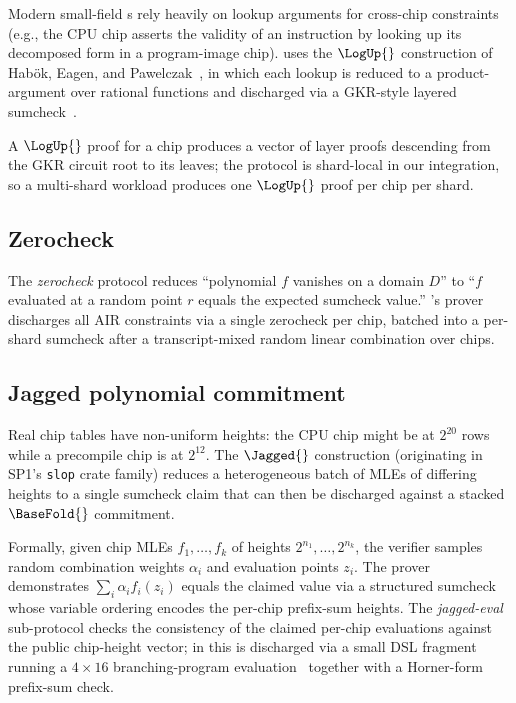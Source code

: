Modern small-field \zkVM s rely heavily on lookup arguments for cross-chip constraints (e.g., the CPU chip asserts the validity of an instruction by looking up its decomposed form in a program-image chip). \Zirenver{} uses the $\LogUp{}$ construction of Habök, Eagen, and Pawelczak~\citep{logup-gkr}, in which each lookup is reduced to a product-argument over rational functions and discharged via a GKR-style layered sumcheck~\citep{gkr-cmt}.

A $\LogUp{}$ proof for a chip produces a vector of layer proofs descending from the GKR circuit root to its leaves; the protocol is shard-local in our integration, so a multi-shard workload produces one $\LogUp{}$ proof per chip per shard.

\subsection{Zerocheck}

The \emph{zerocheck} protocol reduces ``polynomial $f$ vanishes on a domain $D$'' to ``$f$ evaluated at a random point $r$ equals the expected sumcheck value.'' \Zirenver{}'s prover discharges all AIR constraints via a single zerocheck per chip, batched into a per-shard sumcheck after a transcript-mixed random linear combination over chips.

\subsection{Jagged polynomial commitment}

Real \zkVM{} chip tables have non-uniform heights: the CPU chip might be at $2^{20}$ rows while a precompile chip is at $2^{12}$. The $\Jagged{}$ construction (originating in SP1's \texttt{slop} crate family) reduces a heterogeneous batch of MLEs of differing heights to a single sumcheck claim that can then be discharged against a stacked $\BaseFold{}$ commitment.

Formally, given chip MLEs $f_1, \ldots, f_k$ of heights $2^{n_1}, \ldots, 2^{n_k}$, the verifier samples random combination weights $\alpha_i$ and evaluation points $z_i$. The prover demonstrates $\sum_i \alpha_i f_i(z_i)$ equals the claimed value via a structured sumcheck whose variable ordering encodes the per-chip prefix-sum heights. The \emph{jagged-eval} sub-protocol checks the consistency of the claimed per-chip evaluations against the public chip-height vector; in \Zirenver{} this is discharged via a small DSL fragment running a $4\times 16$ branching-program evaluation~\citep{barrington1989bounded} together with a Horner-form prefix-sum check.

